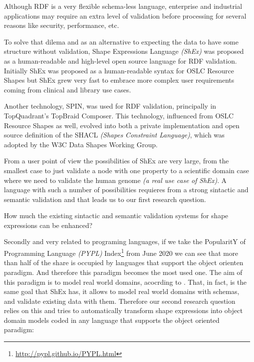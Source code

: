 Although RDF is a very flexible schema-less language, enterprise and industrial applications may require an extra level of
validation before processing for several reasons like security, performance, etc.

To solve that dilema and as an alternative to expecting the data to have some structure without validation, Shape Expressions Language
\textit{(ShEx)} was proposed as a human-readable and high-level open source language for RDF validation. Initially ShEx was proposed
as a human-readable syntax for OSLC Resource Shapes \cite{oslc-resource-shape} but ShEx grew very fast to embrace more
complex user requirements coming from clinical and library use cases.

Another technology, SPIN, was used for RDF validation, principally in TopQuadrant’s TopBraid Composer. This technology, influenced
from OSLC Resource Shapes as well, evolved into both a private implementation and open source definition of the SHACL
\textit{(Shapes Constraint Language)}, which was adopted by the W3C Data Shapes Working Group.

From a user point of view the possibilities of ShEx are very large, from the smallest case to just validate a node with one property
to a scientific domain case where we need to validate the human genome \textit{(a real use case of ShEx)}. A language with such a number
of possibilities requieres from a strong sintactic and semantic validation and that leads us to our first research question.

\begin{researchquestion}
  How much the existing sintactic and semantic validation systems for shape expressions can be enhanced?
\end{researchquestion}

Secondly and very related to programing languages, if we take the PopularitY of Programming Language \textit{(PYPL)} Index\footnote{\url{http://pypl.github.io/PYPL.html}}
from June 2020 we can see that more than half of the share is occupied by languages that support the object orienten paradigm. And therefore this paradigm
becomes the most used one. The aim of this paradigm is to model real world domains, acocrding to \cite{wegner1990concepts}. That, in fact, is the same goal
that ShEx has, it allows to model real world domains with schemas, and validate existing data with them. Therefore our second research question relies on this and tries
to automatically transform shape expressions into object domain models coded in any language that supports the object oriented paradigm:

